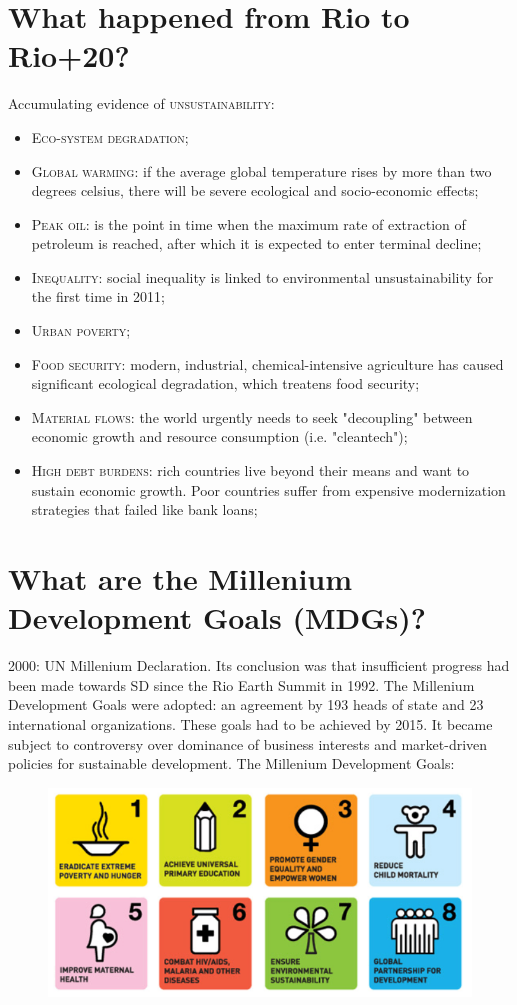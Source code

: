 \section{What happened from Rio to Rio+20?}
Accumulating evidence of \textsc{unsustainability}:
\begin{itemize}
\item \textsc{Eco-system degradation};
\item \textsc{Global warming}: if the average global temperature rises by more than two degrees celsius, there will be severe ecological and socio-economic effects;
\item \textsc{Peak oil}: is the point in time when the maximum rate of extraction of petroleum is reached, after which it is expected to enter terminal decline; 
\item \textsc{Inequality}: social inequality is linked to environmental unsustainability for the first time in 2011;
\item \textsc{Urban poverty};
\item \textsc{Food security}: modern, industrial, chemical-intensive agriculture has caused significant ecological degradation, which treatens food security;
\item \textsc{Material flows}: the world urgently needs to seek "decoupling" between economic growth and resource consumption (i.e. "cleantech");
\item \textsc{High debt burdens}: rich countries live beyond their means and want to sustain economic growth. Poor countries suffer from expensive modernization strategies that failed like bank loans; 
\end{itemize}

\section{What are the Millenium Development Goals (MDGs)?}
2000: UN Millenium Declaration. Its conclusion was that insufficient progress had been made towards SD since the Rio Earth Summit in 1992. The Millenium Development Goals were adopted: an agreement by 193 heads of state and 23 international organizations. These goals had to be achieved by 2015. It became subject to controversy over dominance of business interests and market-driven policies for sustainable development. The Millenium Development Goals:
\begin{figure}[ht]
\begin{center}
\includegraphics{MDG}
\end{center}
\end{figure}

